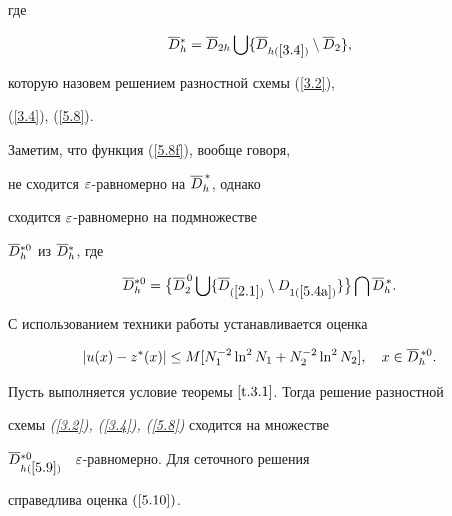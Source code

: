 где


$$


\Db{}_h^{*}=\Db_{2h}\bigcup \{\Db_{h(\ref{3.4})}\setminus \Db_2\},


$$


которую назовем решением разностной схемы (\ref{3.2}),


(\ref{3.4}), (\ref{5.8}).





Заметим, что функция (\ref{5.8f}), вообще говоря,


не сходится $\varepsilon$-равномерно на  $\overline{D}_h^{\,*}$, однако


сходится $\varepsilon$-равномерно на подмножестве


$\overline{D}{}_h^{*0}$ из  $\overline{D}{}_h^{*}$, где


\begin{equation} \label{5.9}


\Db{}_h^{*0}=\big\{\Db^{\,0}_2 \bigcup


\{\Db_{(\ref{2.1})}\setminus D_{1(\ref{5.4a})}\}\big\}


\bigcap \Db{}_h^{\,*}.


\end{equation}





С использованием техники работы \cite{1} устанавливается оценка


\begin{equation} \label{5.10}


|u(x)-z^*(x)|\le M[N_1^{-2}\ln^2 N_1 +


N_2^{-2}\ln^2 N_2], \quad x\in \Db{}_h^{\,*0}.


\end{equation}





\begin{thms} \label{t.5.2}


Пусть выполняется условие теоремы $\ref{t.3.1}$. Тогда решение разностной


схемы {\em (\ref{3.2}), (\ref{3.4}), (\ref{5.8})} сходится на множестве


$\overline{D}{}^{*0}_{h(\ref{5.9})}$ \ $\varepsilon$-равномерно. Для сеточного решения


справедлива оценка $(\ref{5.10})$.


\end{thms}





